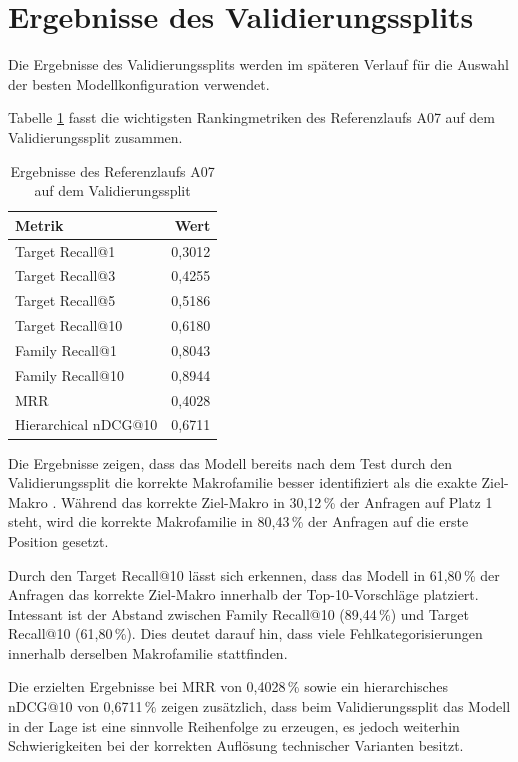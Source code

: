 \section{Ergebnisse des Validierungssplits}

Die Ergebnisse des Validierungssplits werden im späteren Verlauf für die Auswahl der besten Modellkonfiguration verwendet.

Tabelle \ref{tab:validation_ergebnisse} fasst die wichtigsten Rankingmetriken des Referenzlaufs A07 auf dem Validierungssplit zusammen. 

\begin{table}[tbp] 
  \centering 
  \caption{Ergebnisse des Referenzlaufs A07 auf dem Validierungssplit} 
  \label{tab:validation_ergebnisse} 
  \begin{tabular}{lr} \toprule \textbf{Metrik} & \textbf{Wert} \\ 
    \midrule 
    Target Recall@1 & 0,3012 \\ 
    Target Recall@3 & 0,4255 \\ 
    Target Recall@5 & 0,5186 \\ 
    Target Recall@10 & 0,6180 \\ 
    Family Recall@1 & 0,8043 \\ 
    Family Recall@10 & 0,8944 \\ 
    MRR & 0,4028 \\ 
    Hierarchical nDCG@10 & 0,6711 \\ 
    \bottomrule 
  \end{tabular} 
\end{table}

Die Ergebnisse zeigen, dass das Modell bereits nach dem Test durch den Validierungssplit die korrekte Makrofamilie besser identifiziert als die exakte Ziel-Makro \parencite{EPLAN-Makros}.
Während das korrekte Ziel-Makro \parencite{EPLAN-Makros} in 30,12\,\% der Anfragen auf Platz 1 steht, wird die korrekte Makrofamilie in 80,43\,\% der Anfragen auf die erste Position gesetzt.

Durch den Target Recall@10 lässt sich erkennen, dass das Modell in 61,80\,\% der Anfragen das korrekte Ziel-Makro \parencite{EPLAN-Makros} innerhalb der Top-10-Vorschläge platziert.
Intessant ist der Abstand zwischen Family Recall@10 (89,44\,\%) und Target Recall@10 (61,80\,\%). Dies deutet darauf hin, dass viele Fehlkategorisierungen innerhalb derselben Makrofamilie stattfinden.

Die erzielten Ergebnisse bei MRR von 0,4028\,\% sowie ein hierarchisches nDCG@10 von 0,6711\,\%  zeigen zusätzlich, dass beim Validierungssplit das Modell in der Lage ist eine sinnvolle Reihenfolge zu erzeugen, 
es jedoch weiterhin Schwierigkeiten bei der korrekten Auflösung technischer Varianten besitzt.

